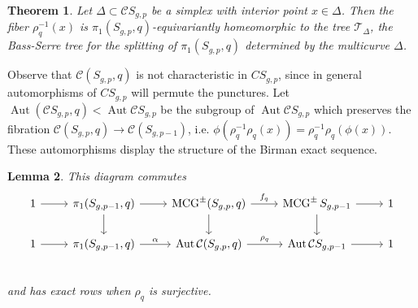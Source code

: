 \documentclass[11pt]{article}
\DeclareMathOperator{\mcg}{MCG}
\DeclareMathOperator{\aaut}{Aut}
\newtheorem{theorem}{Theorem}
\newtheorem{lemma}[theorem]{Lemma}
\theoremstyle{remark}
\theoremstyle{definition}
\begin{document}
\begin{theorem}
  Let $\Delta \subset \mathcal C S_{g,p}$
  be a simplex with interior point $x \in \Delta$.
  Then the fiber $\rho^{-1}_q(x)$ is
  $\pi_1 \left ( S_{g,p}, q \right )$-equivariantly
  homeomorphic to the tree $\mathcal T_\Delta$,
  the Bass-Serre tree for the splitting of
  $\pi_1 \left ( S_{g,p}, q \right )$
  determined by the multicurve $\Delta$.
  \label{thm:kent}
\end{theorem}


Observe that $\mathcal C(S_{g,p},q)$
is not characteristic in $C S_{g,p}$,
since in general automorphisms of $C S_{g,p}$ will permute the punctures.
Let $\aaut (\mathcal C S_{g,p},q) < \aaut \mathcal C S_{g,p}$
be the subgroup of $\aaut \mathcal C S_{g,p}$
which preserves the fibration
$\mathcal C(S_{g,p},q) \to \mathcal C(S_{g,p-1})$, i.e.
$\phi \left ( \rho_q^{-1}\rho_q(x) \right ) = \rho_q^{-1}\rho_q(\phi(x))$.
These automorphisms display the structure of the Birman exact sequence.

\begin{lemma}
  This diagram commutes
  $$
  \begin{tikzcd}
  1 \arrow[r]&
  \pi_1(S_{g,p-1},q) \arrow[r] \arrow[d]&
  \mcg^{\pm}(S_{g,p},q)  \arrow{r}{f_q} \arrow[d]&
  \mcg^{\pm}S_{g,p-1} \arrow[r] \arrow[d]&
  1 \\
  1 \arrow[r]&
  \pi_1(S_{g,p-1},q) \arrow{r}{\alpha}&
  \aaut \mathcal C (S_{g,p},q)  \arrow{r}{\rho_{q}}&
  \aaut \mathcal C S_{g,p-1} \arrow{r}&
  1 \\
  \end{tikzcd}
  $$
  and has exact rows when $\rho_{q}$ is surjective.
  \label{lemma:exact}
\end{lemma}
\end{document}
